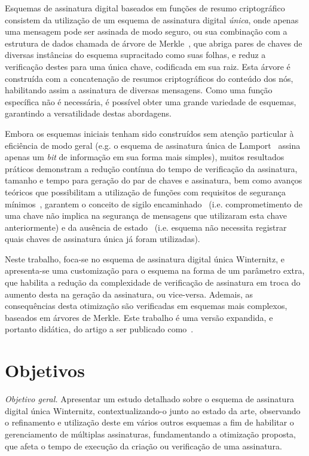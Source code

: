 \documentclass[12pt]{report}
\begin{document}
Esquemas de assinatura digital baseados em funções de resumo criptográfico
consistem da utilização de um esquema de assinatura digital \emph{única}, onde
apenas uma mensagem pode ser assinada de modo seguro, ou sua combinação com a
estrutura de dados chamada de árvore de Merkle~\cite{Merkle:1989:CDS:118209.118230},
que abriga pares de chaves de diversas instâncias
do esquema supracitado como suas folhas, e reduz a verificação destes para uma
única chave, codificada em sua raiz. Esta árvore é construída com a
concatenação de resumos criptográficos do conteúdo dos nós, habilitando assim a
assinatura de diversas mensagens. Como uma função específica não é necessária,
é possível obter uma grande variedade de esquemas, garantindo a versatilidade
destas abordagens.

Embora os esquemas iniciais tenham sido construídos sem atenção particular à
eficiência de modo geral (e.g. o esquema de assinatura única de
Lamport~\cite{lamport1979constructing} assina apenas um \emph{bit}
de informação em sua forma mais simples), muitos resultados práticos demonstram
a redução contínua do tempo de verificação da assinatura, tamanho e tempo para
geração do par de chaves e assinatura, bem como avanços teóricos que
possibilitam a utilização de funções com requisitos de segurança 
mínimos~\cite{Hlsing2013}, garantem o conceito de sigilo
encaminhado~\cite{Buchmann:2011:XPF:2184003.2184011} (i.e. comprometimento de
uma chave não implica na segurança de mensagens que utilizaram esta chave
anteriormente) e da ausência de estado~\cite{Bernstein2015} (i.e. esquema não
necessita registrar quais chaves de assinatura única já foram utilizadas).

Neste trabalho, foca-se no esquema de assinatura digital única Winternitz, e
apresenta-se uma customização para o esquema na forma de um parâmetro extra,
que habilita a redução da complexidade de verificação de assinatura em troca
do aumento desta na geração da assinatura, ou vice-versa. Ademais, as
consequências desta otimização são verificadas em esquemas mais complexos,
baseados em árvores de Merkle. Este trabalho é uma versão expandida,
e portanto didática, do artigo a ser publicado como~\cite{Peri1806:Tuning}.

\section{Objetivos}

\emph{Objetivo geral.} Apresentar um estudo detalhado sobre o esquema de
assinatura digital única Winternitz, contextualizando-o junto ao estado da
arte, observando o refinamento e utilização deste em vários outros esquemas a
fim de habilitar o gerenciamento de múltiplas assinaturas, fundamentando a
otimização proposta, que afeta o tempo de execução da criação ou
verificação de uma assinatura.
\end{document}
